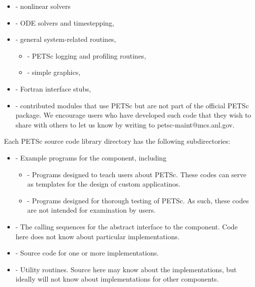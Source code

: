 \begin{itemize}
\begin{itemize}
\begin{itemize}
 \end{itemize}
 \item {} - nonlinear solvers
 \item {} - ODE solvers and timestepping,
 \item {} - general system-related routines,
 \begin{itemize}
   \item {} - PETSc logging and profiling routines,
   \item {} - simple graphics,
 \end{itemize}
 \item {} - Fortran interface stubs,
 \item {} - contributed modules that use PETSc but are not
    part of the official PETSc package.  We encourage users who have
    developed such code that they wish to share with others to let us
    know by writing to petsc-maint@mcs.anl.gov.
 \end{itemize}
\end{itemize}

Each PETSc source code library directory has the following subdirectories:
\begin{itemize}
\item  {} - Example programs for the component, including
  \begin{itemize}
  \item {} - Programs designed to teach users about PETSc.  These
          codes can serve as templates for the design of custom applicatinos.
  \item {} - Programs designed for thorough testing of PETSc.  As such,
          these codes are not intended for examination by users.
  \end{itemize}
\item  {} - The calling sequences for the abstract interface  
        to the component.
        Code here does not know about particular implementations.
\item  {} - Source code for one or more implementations.
\item  {} - Utility routines.  Source here may know about the 
          implementations, but ideally will not know about implementations
          for other components.
\end{itemize}

%
%


